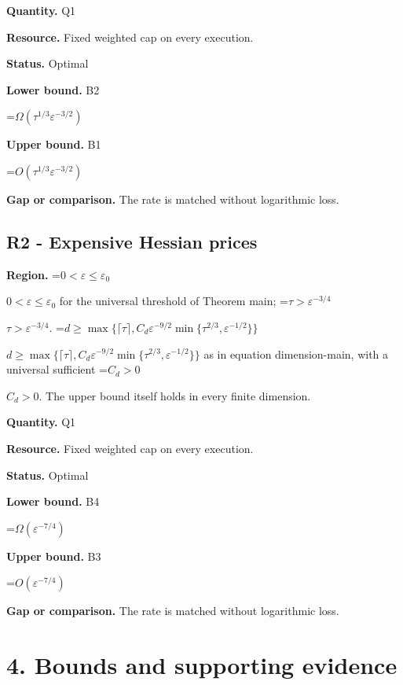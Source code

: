 \documentclass[10pt,a4paper]{article}
\newcommand{\AtlasMath}[1]{\par\begingroup\centering\setbox0=\hbox{$\displaystyle #1$}\ifdim\wd0>1.4\linewidth\typeout{ATLAS WIDE FORMULA: \the\wd0}\fi\ifdim\wd0>\linewidth\resizebox{\linewidth}{!}{\box0}\else\box0\fi\par\endgroup}
\newcommand{\AtlasInlineMath}[1]{\begingroup\setbox0=\hbox{$#1$}\ifdim\wd0>.4\linewidth\endgroup\AtlasMath{#1}\else\endgroup$#1$\fi}
\begin{document}
\textbf{Quantity.} Q1



\textbf{Resource.} Fixed weighted cap on every execution.



\textbf{Status.} Optimal



\textbf{Lower bound.} B2



\AtlasMath{\Omega(\tau^{1/3}\varepsilon^{-3/2})}


\textbf{Upper bound.} B1



\AtlasMath{O(\tau^{1/3}\varepsilon^{-3/2})}


\textbf{Gap or comparison.} The rate is matched without logarithmic loss.



\subsection{R2 - Expensive Hessian prices}


\textbf{Region.} \AtlasInlineMath{0<\varepsilon\le\varepsilon_0} for the universal threshold of Theorem main; \AtlasInlineMath{\tau>\varepsilon^{-3/4}}. \AtlasInlineMath{d\ge\max\{\lceil\tau\rceil,C_d\varepsilon^{-9/2}\min\{\tau^{2/3},\varepsilon^{-1/2}\}\}} as in equation dimension-main, with a universal sufficient \AtlasInlineMath{C_d>0}. The upper bound itself holds in every finite dimension.



\textbf{Quantity.} Q1



\textbf{Resource.} Fixed weighted cap on every execution.



\textbf{Status.} Optimal



\textbf{Lower bound.} B4



\AtlasMath{\Omega(\varepsilon^{-7/4})}


\textbf{Upper bound.} B3



\AtlasMath{O(\varepsilon^{-7/4})}


\textbf{Gap or comparison.} The rate is matched without logarithmic loss.



\section{4. Bounds and supporting evidence}
\end{document}
